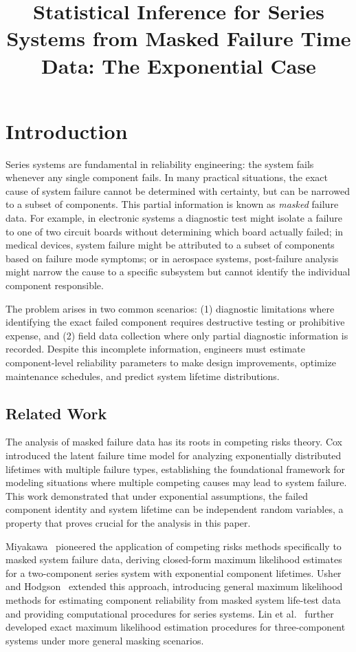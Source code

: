 \documentclass[pdflatex,sn-mathphys-num,Numbered]{sn-jnl}
\title[Article Title]{Statistical Inference for Series Systems from Masked Failure Time Data: The Exponential Case}
\theoremstyle{thmstyleone}
\theoremstyle{thmstylethree}
\theoremstyle{thmstyletwo}
\begin{document}
\maketitle

\section{Introduction}
\label{sec:intro}

Series systems are fundamental in reliability engineering: the system fails whenever any single component fails. In many practical situations, the exact cause of system failure cannot be determined with certainty, but can be narrowed to a subset of components. This partial information is known as \emph{masked} failure data. For example, in electronic systems a diagnostic test might isolate a failure to one of two circuit boards without determining which board actually failed; in medical devices, system failure might be attributed to a subset of components based on failure mode symptoms; or in aerospace systems, post-failure analysis might narrow the cause to a specific subsystem but cannot identify the individual component responsible.

The problem arises in two common scenarios: (1) diagnostic limitations where identifying the exact failed component requires destructive testing or prohibitive expense, and (2) field data collection where only partial diagnostic information is recorded. Despite this incomplete information, engineers must estimate component-level reliability parameters to make design improvements, optimize maintenance schedules, and predict system lifetime distributions.

\subsection{Related Work}

The analysis of masked failure data has its roots in competing risks theory. Cox~\cite{cox1959} introduced the latent failure time model for analyzing exponentially distributed lifetimes with multiple failure types, establishing the foundational framework for modeling situations where multiple competing causes may lead to system failure. This work demonstrated that under exponential assumptions, the failed component identity and system lifetime can be independent random variables, a property that proves crucial for the analysis in this paper.

Miyakawa~\cite{miyakawa1984} pioneered the application of competing risks methods specifically to masked system failure data, deriving closed-form maximum likelihood estimates for a two-component series system with exponential component lifetimes. Usher and Hodgson~\cite{usher1988} extended this approach, introducing general maximum likelihood methods for estimating component reliability from masked system life-test data and providing computational procedures for series systems. Lin et al.~\cite{exactmle} further developed exact maximum likelihood estimation procedures for three-component systems under more general masking scenarios.
\end{document}

